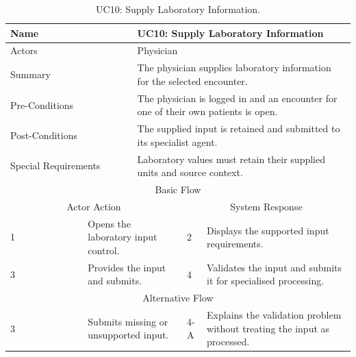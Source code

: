 \begin{table}[htbp]
\centering
\small
\caption{UC10: Supply Laboratory Information.}
\label{tab:kashaf:uc10}
\begin{tabular}{|p{}|p{}|p{}|p{}|p{}|}
\hline
\multicolumn{2}{|p{\dimexpr0.225\textwidth+2\tabcolsep+\arrayrulewidth\relax}|}{Name} & \multicolumn{3}{p{\dimexpr0.575\textwidth+4\tabcolsep+2\arrayrulewidth\relax}|}{UC10: Supply Laboratory Information} \\ \hline
\multicolumn{2}{|p{\dimexpr0.225\textwidth+2\tabcolsep+\arrayrulewidth\relax}|}{Actors} & \multicolumn{3}{p{\dimexpr0.575\textwidth+4\tabcolsep+2\arrayrulewidth\relax}|}{Physician} \\ \hline
\multicolumn{2}{|p{\dimexpr0.225\textwidth+2\tabcolsep+\arrayrulewidth\relax}|}{Summary} & \multicolumn{3}{p{\dimexpr0.575\textwidth+4\tabcolsep+2\arrayrulewidth\relax}|}{The physician supplies laboratory information for the selected encounter.} \\ \hline
\multicolumn{2}{|p{\dimexpr0.225\textwidth+2\tabcolsep+\arrayrulewidth\relax}|}{Pre-Conditions} & \multicolumn{3}{p{\dimexpr0.575\textwidth+4\tabcolsep+2\arrayrulewidth\relax}|}{The physician is logged in and an encounter for one of their own patients is open.} \\ \hline
\multicolumn{2}{|p{\dimexpr0.225\textwidth+2\tabcolsep+\arrayrulewidth\relax}|}{Post-Conditions} & \multicolumn{3}{p{\dimexpr0.575\textwidth+4\tabcolsep+2\arrayrulewidth\relax}|}{The supplied input is retained and submitted to its specialist agent.} \\ \hline
\multicolumn{2}{|p{\dimexpr0.225\textwidth+2\tabcolsep+\arrayrulewidth\relax}|}{Special Requirements} & \multicolumn{3}{p{\dimexpr0.575\textwidth+4\tabcolsep+2\arrayrulewidth\relax}|}{Laboratory values must retain their supplied units and source context.} \\ \hline
\multicolumn{5}{|c|}{Basic Flow} \\ \hline
\multicolumn{3}{|c|}{Actor Action} & \multicolumn{2}{c|}{System Response} \\ \hline
1 & \multicolumn{2}{p{\dimexpr0.37\textwidth+2\tabcolsep+\arrayrulewidth\relax}|}{Opens the laboratory input control.} & 2 & Displays the supported input requirements. \\ \hline
3 & \multicolumn{2}{p{\dimexpr0.37\textwidth+2\tabcolsep+\arrayrulewidth\relax}|}{Provides the input and submits.} & 4 & Validates the input and submits it for specialised processing. \\ \hline
\multicolumn{5}{|c|}{Alternative Flow} \\ \hline
3 & \multicolumn{2}{p{\dimexpr0.37\textwidth+2\tabcolsep+\arrayrulewidth\relax}|}{Submits missing or unsupported input.} & 4-A & Explains the validation problem without treating the input as processed. \\ \hline
\end{tabular}
\end{table}

